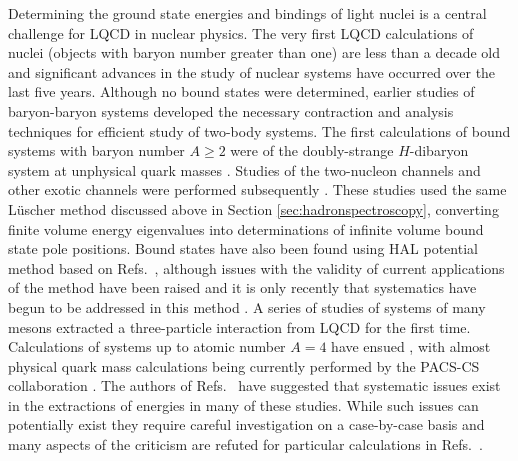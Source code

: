 Determining the ground state energies and bindings of light nuclei is a central challenge for LQCD in nuclear physics. The very first LQCD calculations of nuclei (objects with baryon number greater than one) are less than a decade old and significant advances in the study of nuclear systems have occurred over the last five years. Although no bound states were determined, earlier studies of baryon-baryon systems \cite{Yamazaki:2009ua,Beane:2006gf,Beane:2006mx,Beane:2009gs,Beane:2009kya}  developed the necessary contraction and analysis techniques for efficient study of two-body systems. 
The first calculations of bound systems with baryon number $A\ge2$ were of the doubly-strange $H$-dibaryon system at unphysical quark masses \cite{Beane:2010hg,Inoue:2010es,Beane:2011xf}. 
Studies of the two-nucleon channels \cite{Beane:2011iw} and other exotic channels were performed subsequently \cite{Berkowitz:2015eaa,Francis:2018qch,Wagman:2017tmp}. These studies used the same L\"uscher method discussed above in Section \ref{sec:hadronspectroscopy}, converting finite volume energy eigenvalues into determinations of infinite volume bound state pole positions. Bound states have also been found using HAL potential method \cite{Ishii:2006ec} based on Refs.~\cite{Luscher:1986pf,Lin:2001ek}, although issues with the validity of current applications of the method have been raised  \cite{Detmold:2007wk,Birse:2012ph,Yamazaki:2018qut,Yamazaki:2017gjl,Namekawa:2017sxs} and it is only recently that systematics have begun to be addressed in this method \cite{Kawai:2017goq}.
A series of studies of systems of many mesons \cite{Beane:2007es,Detmold:2008yn,Detmold:2011kw} extracted a three-particle interaction from LQCD for the first time.
Calculations of systems up to atomic number $A=4$  have ensued \cite{Beane:2012vq,Yamazaki:2012hi,Yamazaki:2015asa}, with almost physical quark mass calculations being currently performed by the PACS-CS collaboration \cite{Yamazaki:2015asa}. The authors of Refs.~\cite{Iritani:2018zbt} have suggested that systematic issues exist in the extractions of energies in many of these studies. While such issues can potentially exist they require careful investigation on a case-by-case basis and many aspects of the criticism are refuted for particular calculations in Refs.~\cite{Beane:2017edf,Namekawa:2017sxs,Yamazaki:2017jfh}.

